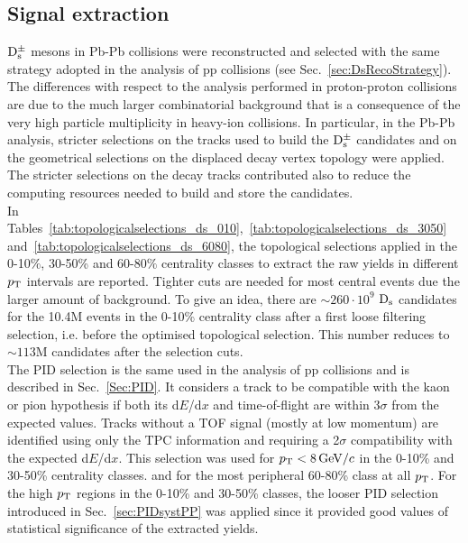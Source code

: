 \subsection{Signal extraction}
\label{sec:SelectionPbPb}
${\rm D_s^{\pm}}$ mesons in Pb-Pb collisions were reconstructed 
and selected with the same strategy adopted in the analysis of pp 
collisions (see Sec.~\ref{sec:DsRecoStrategy}). The differences with respect to
the analysis performed in proton-proton collisions are due to the much larger
combinatorial background that is a consequence of the very 
high particle multiplicity in heavy-ion collisions. In particular, 
in the Pb-Pb analysis, stricter selections on the tracks 
used to build the ${\rm D_s^{\pm}}$ candidates and on the geometrical selections
on the displaced decay vertex topology were applied. 
The stricter selections on the decay tracks contributed also to reduce the computing resources 
needed to build and store the candidates. \\



In Tables~\ref{tab:topologicalselections_ds_010},~\ref{tab:topologicalselections_ds_3050} 
and~\ref{tab:topologicalselections_ds_6080}, the topological selections applied 
in the 0-10$\%$, 30-50\% and 60-80$\%$ centrality classes
to extract the raw yields in different $p_{\rm T}$ intervals are reported. Tighter cuts 
are needed for most central events due the larger amount of background. To give an idea, there are $\sim260 \cdot 10^9$
${\rm D_s}$ candidates for the 10.4M events in the 0-10\% centrality class after a first loose filtering selection, i.e. before the optimised topological selection. This number reduces to $\sim113$M candidates after the selection cuts.\\



The PID selection is the same used in the analysis of pp collisions and 
is described in Sec.~\ref{Sec:PID}. It considers a track to be 
compatible with the kaon or pion hypothesis 
if both its d$E$/d$x$ and time-of-flight are within 3$\sigma$ from the expected values. 
Tracks without a TOF signal (mostly at low momentum) are 
identified using only the TPC information and requiring a 2$\sigma$ 
compatibility with the expected d$E$/d$x$. This selection was used 
for $p_{\rm T} < 8 \, \mathrm{GeV}/c$ in the 0-10\% and 30-50\% centrality classes. 
and for the most peripheral 60-80\% class at all $p_{\rm T}$. For the high $p_{\rm T}$ regions
in the 0-10\% and 30-50\% classes, the looser PID selection introduced in Sec.~\ref{sec:PIDsystPP}
was applied since it provided good values of statistical significance of the extracted yields.


